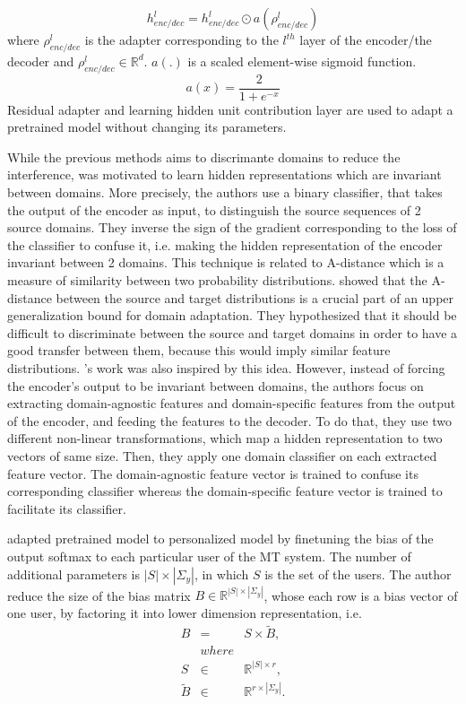 \begin{equation}
h_{enc/dec}^l = h_{enc/dec}^{l} \odot a(\rho^{l}_{enc/dec})
\end{equation}
where $\rho^{l}_{enc/dec}$ is the adapter corresponding to the $l^{th}$ layer of the encoder/the decoder and $\rho^{l}_{enc/dec} \in \mathbb{R}^d$. $a(.)$ is a scaled
element-wise sigmoid function.
$$a(x) = \frac{2}{1+e^{-x}}$$
Residual adapter and learning hidden unit contribution layer are used to adapt a pretrained model without changing its parameters. 

While the previous methods aims to discrimante domains to reduce the interference,\cite{Britz17effective} was motivated to learn hidden representations which are invariant between domains. More precisely, the authors use a binary classifier, that takes the output of the encoder as input, to distinguish the source sequences of 2 source domains. They inverse the sign of the gradient corresponding to the loss of the classifier to confuse it, i.e. making the hidden representation of the encoder invariant between 2 domains. This technique is related to A-distance which is a measure of similarity between two probability distributions. \cite{Ben07analysis} showed that the A-distance between the
source and target distributions is a crucial part of an upper generalization bound for domain adaptation. They hypothesized that it should be difficult to discriminate between the source and target domains in order to have a good transfer between them, because
this would imply similar feature distributions. \cite{Zeng18multidomain}'s work was also inspired by this idea. However, instead of forcing the encoder's output to be invariant between domains, the authors focus on extracting domain-agnostic features and domain-specific features from the output of the encoder, and feeding the features to the decoder. To do that, they use two different non-linear transformations, which map a hidden representation to two vectors of same size. Then, they apply one domain classifier on each extracted feature vector. The domain-agnostic feature vector is trained to confuse its corresponding classifier whereas the domain-specific feature vector is trained to facilitate its classifier.

\cite{Michel18extreme} adapted pretrained model to personalized model by finetuning the
bias of the output softmax to each particular user of the MT system. The number of additional parameters is $|S| \times |\Sigma_y|$, in which $S$ is the set of the users. The author reduce the size of the bias matrix $B \in \mathbb{R}^{|S| \times |\Sigma_y|}$, whose each row is a bias vector of one user, by factoring it into lower dimension representation, i.e.
\begin{equation}
\begin{array}{rcl}
B &=& S \times \tilde{B}, \\
&where& \\
S & \in & \mathbb{R}^{|S| \times r}, \\
\tilde{B} & \in & \mathbb{R}^{r \times |\Sigma_y|}.
\end{array}
\end{equation}

